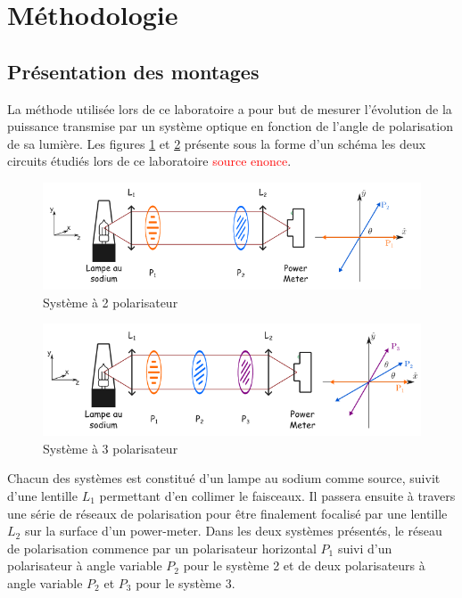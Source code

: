 \documentclass[11pt,letterpaper]{article}
\begin{document}

\section{Méthodologie}


\subsection{Présentation des montages}

La méthode utilisée lors de ce laboratoire a pour but de mesurer l'évolution de la puissance transmise par un système optique en fonction de l'angle de polarisation de sa lumière. Les figures \ref{systeme a 2 polarisateur} et \ref{systeme a 3 polarisateur} présente sous la forme d'un schéma les deux circuits étudiés lors de ce laboratoire \textcolor{red}{source enonce}.

\begin{figure}[H]
  \centering
        \includegraphics[scale=0.71]{Systeme2polarisateurs.png}
        \caption{Système à 2 polarisateur}
        \label{systeme a 2 polarisateur}
\end{figure}

\begin{figure}[H]
  \centering
        \includegraphics[scale=0.71]{Systeme3polarisateurs.png}
        \caption{Système à 3 polarisateur}
        \label{systeme a 3 polarisateur}
\end{figure}

Chacun des systèmes est constitué d'un lampe au sodium comme source, suivit d'une lentille $L_1$ permettant d'en collimer le faisceaux. Il passera ensuite à travers une série de réseaux de polarisation pour être finalement focalisé par une lentille $L_2$ sur la surface d'un power-meter. Dans les deux systèmes présentés, le réseau de polarisation commence par un polarisateur horizontal $P_1$ suivi d'un polarisateur à angle variable $P_2$ pour le système 2 et de deux polarisateurs à angle variable $P_2$ et $P_3$ pour le système 3.
\end{document}
